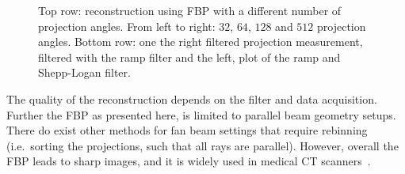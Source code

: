 \begin{figure}
	\centering

	\caption{Top row: reconstruction using \gls{FBP} with a different number of projection
		angles. From left to right: \(32\), \(64\), \(128\) and \(512\) projection angles.
		Bottom row: one the right filtered projection measurement, filtered with the ramp
		filter and the left, plot of the ramp and Shepp-Logan filter.
	}\label{fig:filtered_backprojection_shepp_logan}
\end{figure}

The quality of the reconstruction depends on the filter and data acquisition. Further the FBP as
presented here, is limited to parallel beam geometry setups. There do exist other methods for fan
beam settings that require rebinning (i.e.\ sorting the projections, such that all rays are
parallel). However, overall the FBP leads to sharp images, and it is widely used in medical CT
scanners~\cite{pan_why_2009}.

